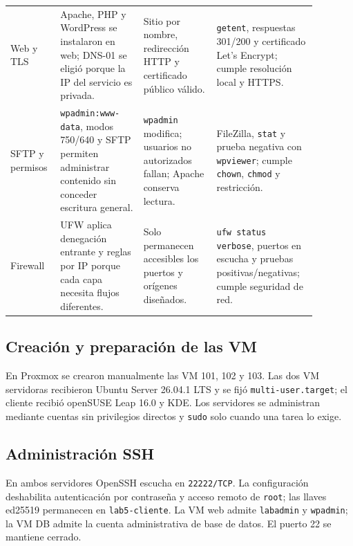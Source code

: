 \begin{longtable}{p{0.13\linewidth}p{0.25\linewidth}p{0.22\linewidth}p{0.28\linewidth}}
Web y TLS & Apache, PHP y WordPress se instalaron en web; DNS-01 se eligió porque la IP del servicio es privada. & Sitio por nombre, redirección HTTP y certificado público válido. & \texttt{getent}, respuestas 301/200 y certificado Let's Encrypt; cumple resolución local y HTTPS. \\
SFTP y permisos & \texttt{wpadmin:www-data}, modos 750/640 y SFTP permiten administrar contenido sin conceder escritura general. & \texttt{wpadmin} modifica; usuarios no autorizados fallan; Apache conserva lectura. & FileZilla, \texttt{stat} y prueba negativa con \texttt{wpviewer}; cumple \texttt{chown}, \texttt{chmod} y restricción. \\
Firewall & UFW aplica denegación entrante y reglas por IP porque cada capa necesita flujos diferentes. & Solo permanecen accesibles los puertos y orígenes diseñados. & \texttt{ufw status verbose}, puertos en escucha y pruebas positivas/negativas; cumple seguridad de red. \\
\bottomrule
\end{longtable}
\normalsize

\subsection{Creación y preparación de las VM}

En Proxmox se crearon manualmente las VM 101, 102 y 103. Las dos VM servidoras recibieron Ubuntu Server 26.04.1 LTS y se fijó \texttt{multi-user.target}; el cliente recibió openSUSE Leap 16.0 y KDE. Los servidores se administran mediante cuentas sin privilegios directos y \texttt{sudo} solo cuando una tarea lo exige.



\subsection{Administración SSH}

En ambos servidores OpenSSH escucha en \texttt{22222/TCP}. La configuración deshabilita autenticación por contraseña y acceso remoto de \texttt{root}; las llaves ed25519 permanecen en \texttt{lab5-cliente}. La VM web admite \texttt{labadmin} y \texttt{wpadmin}; la VM DB admite la cuenta administrativa de base de datos. El puerto 22 se mantiene cerrado.


